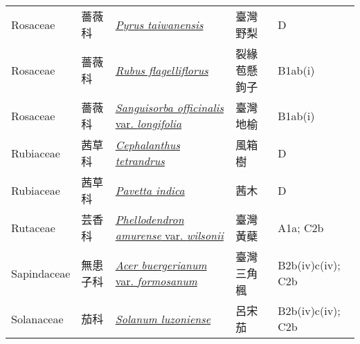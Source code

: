 {\begin{longtable}{L{2.5cm}L{2cm}L{5cm}L{2.5cm}L{3cm}}
    Rosaceae & 薔薇科 & \href{http://www.theplantlist.org/tpl1.1/search?q=Pyrus+taiwanensis}{\textit{Pyrus taiwanensis} } & 臺灣野梨 & D    \\
    Rosaceae & 薔薇科 & \href{http://www.theplantlist.org/tpl1.1/search?q=Rubus+flagelliflorus}{\textit{Rubus flagelliflorus} } & 裂緣苞懸鉤子 & B1ab(i)    \\
    Rosaceae & 薔薇科 & \href{http://www.theplantlist.org/tpl1.1/search?q=Sanguisorba+officinalis+var.+longifolia}{\textit{Sanguisorba officinalis} var. \textit{longifolia} } & 臺灣地榆 & B1ab(i)    \\
    Rubiaceae & 茜草科 & \href{http://www.theplantlist.org/tpl1.1/search?q=Cephalanthus+tetrandrus}{\textit{Cephalanthus tetrandrus} } & 風箱樹 & D    \\
    Rubiaceae & 茜草科 & \href{http://www.theplantlist.org/tpl1.1/search?q=Pavetta+indica}{\textit{Pavetta indica} } & 茜木 & D    \\
    Rutaceae & 芸香科 & \href{http://www.theplantlist.org/tpl1.1/search?q=Phellodendron+amurense+var.+wilsonii}{\textit{Phellodendron amurense} var. \textit{wilsonii} } & 臺灣黃蘗 & A1a; C2b    \\
    Sapindaceae & 無患子科 & \href{http://www.theplantlist.org/tpl1.1/search?q=Acer+buergerianum+var.+formosanum}{\textit{Acer buergerianum} var. \textit{formosanum} } & 臺灣三角楓 & B2b(iv)c(iv); C2b    \\
    Solanaceae & 茄科 & \href{http://www.theplantlist.org/tpl1.1/search?q=Solanum+luzoniense}{\textit{Solanum luzoniense} } & 呂宋茄 & B2b(iv)c(iv); C2b    \\

\end{longtable}}
